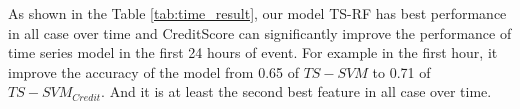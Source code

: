   As shown in the Table \ref{tab:time_result}, our model TS-RF has best performance in all case over time and CreditScore can significantly improve the performance of time series model in the first 24 hours of event. For example in the first hour, it improve the accuracy of the model from 0.65 of $TS-SVM$ to 0.71 of $TS-SVM_{Credit}$. And it is at least the second best feature in all case over time.
 
%
%
%
%
